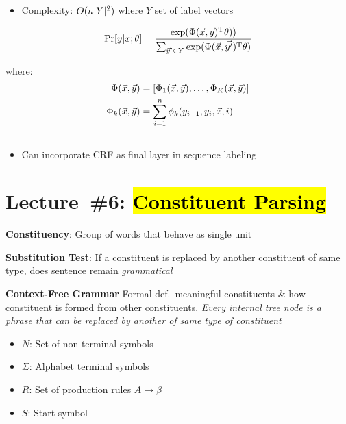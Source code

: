 \documentclass[9pt]{extarticle}
\renewcommand{\green}[1]{{\color{ForestGreen} #1}}
\newcommand{\greenbf}[1]{\textbf{\green{#1}}}
\begin{document}
\begin{multicols}{3}
  \subsection*{}
  \begin{itemize}
    \item Complexity: $O(n\lvert Y\rvert^{2})$ where $Y$ set of label vectors
  \end{itemize}

  \begin{equation*}
    \Pr[y \vert x; \theta] = \frac{\exp(\Phi(\vec{x},\vec{y})^{\text{T}}\theta))}{\sum_{\vec{y}' \in Y} \exp(\Phi(\vec{x}, \vec{y'})^{\text{T}}\theta)}
  \end{equation*}

  where:
  \begin{align*}
      \Phi(\vec{x},\vec{y}) &= \lbrack\Phi_{1}(\vec{x},\vec{y}),\ldots,\Phi_{K}(\vec{x},\vec{y})\rbrack \\
      \Phi_{k}(\vec{x},\vec{y}) &= \sum_{i=1}^{n} \phi_{k}(y_{i-1},y_{i},\vec{x},i)
  \end{align*}
  \subsection*{}

  \begin{itemize}
    \item Can incorporate CRF as final layer in sequence labeling
  \end{itemize}

  \section*{Lecture~\#6: \hl{Constituent Parsing}}

  \greenbf{Constituency}: Group of words that behave as single unit

  \greenbf{Substitution Test}: If a constituent is replaced by another constituent of same type, does sentence remain \textit{grammatical}

  \greenbf{Context-Free Grammar} Formal def.\ meaningful constituents \& how constituent is formed from other constituents.  \textit{Every internal tree node is a phrase that can be replaced by another of same type of constituent}
  \begin{itemize}
    \item $N$: Set of non-terminal symbols
    \item $\Sigma$: Alphabet terminal symbols
    \item $R$: Set of production rules $A \rightarrow \beta$
    \item $S$: Start symbol
  \end{itemize}


\end{multicols}
\end{document}
